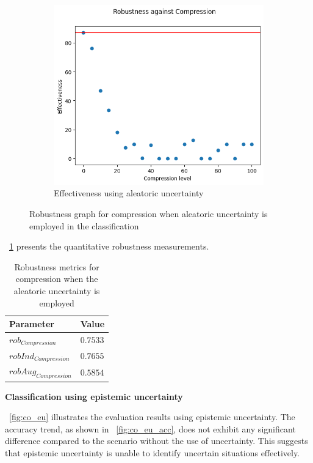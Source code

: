 \begin{figure}[h]
\begin{subfigure}{.33\textwidth}
		\centering
		\includegraphics[width=0.9\linewidth]{ImageFiles/EvalBNN/CO/AU/eff}
		\caption{Effectiveness using aleatoric uncertainty}
		\label{fig:co_au_eff}
	\end{subfigure}
	\caption{Robustness graph for compression when aleatoric uncertainty is employed in the classification}
	\label{fig:co_au}
\end{figure}

\Tab~\ref{table:rob_co_au} presents the quantitative robustness measurements.
\begin{table}[h]
	\centering
	\begin{tabular}{|| l | l ||} 
		\hline
		\textbf{Parameter} & \textbf{Value} \\
		\hline
		\hline
		$rob_{Compression}$ & $0.7533$ \\
		$robInd_{Compression}$ & $0.7655$ \\
		$robAug_{Compression}$ & $0.5854$ \\	
		\hline
	\end{tabular}	
	\caption{Robustness metrics for compression when the aleatoric uncertainty is employed}
	\label{table:rob_co_au}
\end{table}

\vspace{0.3cm}
\textbf{Classification using epistemic uncertainty}
\vspace{0.1cm}

\Fig~\ref{fig:co_eu} illustrates the evaluation results using epistemic uncertainty. The accuracy trend, as shown in \Fig~\ref{fig:co_eu_acc}, does not exhibit any significant difference compared to the scenario without the use of uncertainty. This suggests that epistemic uncertainty is unable to identify uncertain situations effectively.

